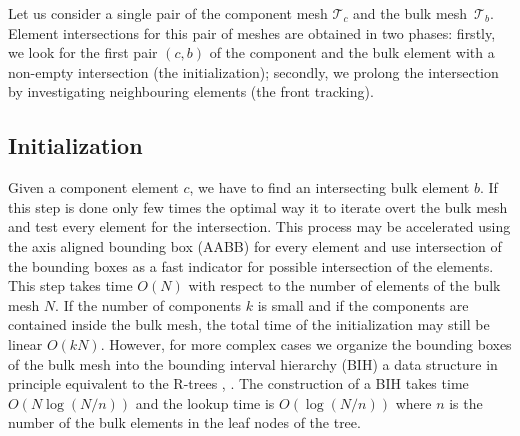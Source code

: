 \documentclass{elsarticle}
\begin{document}
Let us consider a single pair of the component mesh $\mathcal T_c$ and the bulk mesh~$\mathcal T_b$. 
Element intersections for this pair of meshes are obtained in two phases: firstly, we look for the 
first pair $(c,b)$ of the component and the bulk element with a non-empty intersection (the initialization); 
secondly, we prolong the intersection by investigating neighbouring elements (the front tracking).



\subsection{Initialization}
\label{sec:initialization}
Given a component element $c$, we have to find an intersecting bulk element $b$.
If this step is done only few times the optimal way it to iterate overt the bulk mesh and test every element for the intersection.
This process may be accelerated using the axis aligned bounding box (AABB) for every element and use intersection of the bounding boxes
as a fast indicator for possible intersection of the elements. This step takes time $O(N)$ with respect to the number of elements of the bulk mesh $N$.
If the number of components $k$ is small and if the components are contained inside the bulk mesh, the total time of the initialization 
may still be linear $O(kN)$. However, for more complex cases we organize the bounding boxes of the bulk mesh into the bounding interval
hierarchy (BIH) \cite{EGWR:EGSR06:139-149} a data structure in principle equivalent 
to the R-trees \cite{guttman_r-trees:_1984}, \cite{nam_comparative_2004}. The construction of a BIH takes time $O(N\log(N/n))$ 
and the lookup time is $O(\log(N/n))$ where $n$ is the number of the bulk elements in the leaf nodes of the tree.
 
\end{document}
